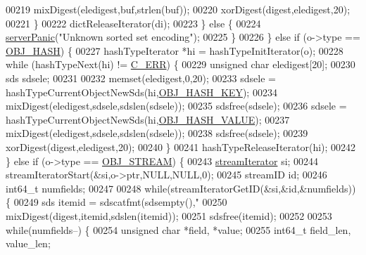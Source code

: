 \begin{DoxyCode}
{{00219                         mixDigest(eledigest,buf,strlen(buf));
00220                         xorDigest(digest,eledigest,20);
00221                     \}
00222                     dictReleaseIterator(di);
00223                 \} \textcolor{keywordflow}{else} \{
00224                     \hyperlink{server_8h_a11cc378e7778a830b41240578de3b204}{serverPanic}(\textcolor{stringliteral}{"Unknown sorted set encoding"});
00225                 \}
00226             \} \textcolor{keywordflow}{else} \textcolor{keywordflow}{if} (o->type == \hyperlink{server_8h_a87c05ba4f7f36741864277f02a4423fb}{OBJ\_HASH}) \{
00227                 hashTypeIterator *hi = hashTypeInitIterator(o);
00228                 \textcolor{keywordflow}{while} (hashTypeNext(hi) != \hyperlink{server_8h_af98ac28d5f4d23d7ed5985188e6fb7d1}{C\_ERR}) \{
00229                     \textcolor{keywordtype}{unsigned} \textcolor{keywordtype}{char} eledigest[20];
00230                     sds sdsele;
00231 
00232                     memset(eledigest,0,20);
00233                     sdsele = hashTypeCurrentObjectNewSds(hi,\hyperlink{server_8h_aede46b2a96d6f19aff38ccdac76598ac}{OBJ\_HASH\_KEY});
00234                     mixDigest(eledigest,sdsele,sdslen(sdsele));
00235                     sdsfree(sdsele);
00236                     sdsele = hashTypeCurrentObjectNewSds(hi,\hyperlink{server_8h_a1f87a280688b29cd45aa3aa0dceac7c7}{OBJ\_HASH\_VALUE});
00237                     mixDigest(eledigest,sdsele,sdslen(sdsele));
00238                     sdsfree(sdsele);
00239                     xorDigest(digest,eledigest,20);
00240                 \}
00241                 hashTypeReleaseIterator(hi);
00242             \} \textcolor{keywordflow}{else} \textcolor{keywordflow}{if} (o->type == \hyperlink{server_8h_a2c2cc41300ca6b9daca7ea8a6d66edc6}{OBJ\_STREAM}) \{
00243                 \hyperlink{structstreamIterator}{streamIterator} si;
00244                 streamIteratorStart(&si,o->ptr,NULL,NULL,0);
00245                 streamID id;
00246                 int64\_t numfields;
00247 
00248                 \textcolor{keywordflow}{while}(streamIteratorGetID(&si,&id,&numfields)) \{
00249                     sds itemid = sdscatfmt(sdsempty(),\textcolor{stringliteral}{"%
00250                     mixDigest(digest,itemid,sdslen(itemid));
00251                     sdsfree(itemid);
00252 
00253                     \textcolor{keywordflow}{while}(numfields--) \{
00254                         \textcolor{keywordtype}{unsigned} \textcolor{keywordtype}{char} *field, *value;
00255                         int64\_t field\_len, value\_len;
}}}
\end{DoxyCode}
